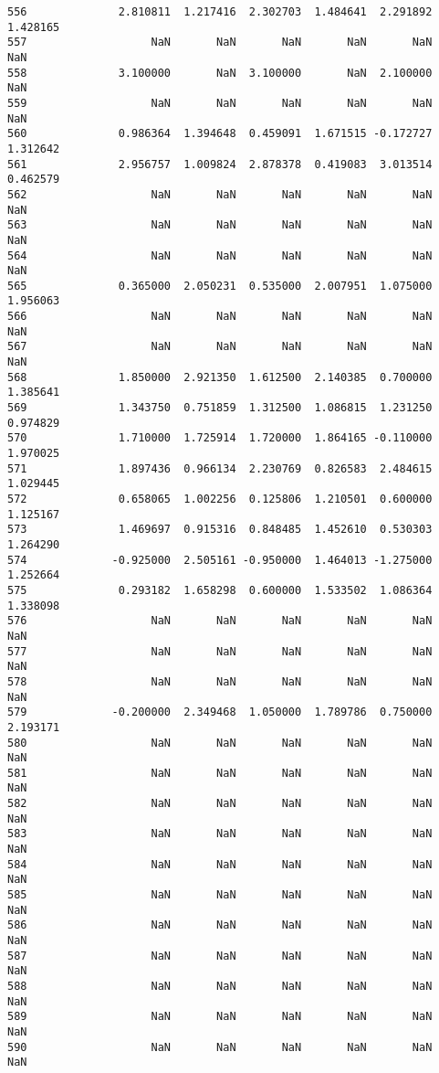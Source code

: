 \documentclass[11pt]{article}
\begin{document}
\begin{Verbatim}[commandchars=\\\{\}]
556              2.810811  1.217416  2.302703  1.484641  2.291892  1.428165
557                   NaN       NaN       NaN       NaN       NaN       NaN
558              3.100000       NaN  3.100000       NaN  2.100000       NaN
559                   NaN       NaN       NaN       NaN       NaN       NaN
560              0.986364  1.394648  0.459091  1.671515 -0.172727  1.312642
561              2.956757  1.009824  2.878378  0.419083  3.013514  0.462579
562                   NaN       NaN       NaN       NaN       NaN       NaN
563                   NaN       NaN       NaN       NaN       NaN       NaN
564                   NaN       NaN       NaN       NaN       NaN       NaN
565              0.365000  2.050231  0.535000  2.007951  1.075000  1.956063
566                   NaN       NaN       NaN       NaN       NaN       NaN
567                   NaN       NaN       NaN       NaN       NaN       NaN
568              1.850000  2.921350  1.612500  2.140385  0.700000  1.385641
569              1.343750  0.751859  1.312500  1.086815  1.231250  0.974829
570              1.710000  1.725914  1.720000  1.864165 -0.110000  1.970025
571              1.897436  0.966134  2.230769  0.826583  2.484615  1.029445
572              0.658065  1.002256  0.125806  1.210501  0.600000  1.125167
573              1.469697  0.915316  0.848485  1.452610  0.530303  1.264290
574             -0.925000  2.505161 -0.950000  1.464013 -1.275000  1.252664
575              0.293182  1.658298  0.600000  1.533502  1.086364  1.338098
576                   NaN       NaN       NaN       NaN       NaN       NaN
577                   NaN       NaN       NaN       NaN       NaN       NaN
578                   NaN       NaN       NaN       NaN       NaN       NaN
579             -0.200000  2.349468  1.050000  1.789786  0.750000  2.193171
580                   NaN       NaN       NaN       NaN       NaN       NaN
581                   NaN       NaN       NaN       NaN       NaN       NaN
582                   NaN       NaN       NaN       NaN       NaN       NaN
583                   NaN       NaN       NaN       NaN       NaN       NaN
584                   NaN       NaN       NaN       NaN       NaN       NaN
585                   NaN       NaN       NaN       NaN       NaN       NaN
586                   NaN       NaN       NaN       NaN       NaN       NaN
587                   NaN       NaN       NaN       NaN       NaN       NaN
588                   NaN       NaN       NaN       NaN       NaN       NaN
589                   NaN       NaN       NaN       NaN       NaN       NaN
590                   NaN       NaN       NaN       NaN       NaN       NaN

\end{Verbatim}
\end{document}
